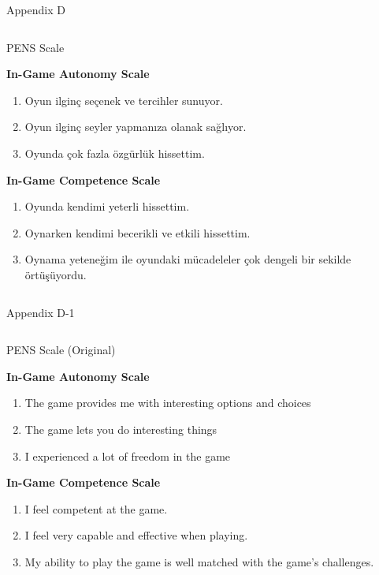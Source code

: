 \documentclass{beamer}
\begin{document}
\begin{frame}[label=appD, plain]{Appendix D}
  \begin{columns}[t]
    \begin{exampleblock}{PENS Scale}

\small \textbf{In-Game Autonomy Scale}
\begin{enumerate}
\item Oyun ilginç seçenek ve tercihler sunuyor.
\item Oyun ilginç seyler yapmanıza olanak sağlıyor.
\item Oyunda çok fazla özgürlük hissettim.
\end{enumerate}

\small \textbf{In-Game Competence Scale}
\begin{enumerate}
\item  Oyunda kendimi yeterli hissettim.
\item  Oynarken kendimi becerikli ve etkili hissettim.
\item  Oynama yeteneğim ile oyundaki mücadeleler çok dengeli bir sekilde örtüşüyordu.
\end{enumerate}

    \end{exampleblock}
  \end{columns}  
\end{frame}

\begin{frame}[label=appD1, plain]{Appendix D-1}
  \begin{columns}[t]
    \begin{exampleblock}{PENS Scale (Original) \cite{Dennie2012AutonomyMotivation, PrzybylskiRigbyRyan2006MotivationPullofGames, Peng2012NeedSupportiveFeatures}}

\small \textbf{In-Game Autonomy Scale}
\begin{enumerate}
\item The game provides me with interesting options and choices
\item The game lets you do interesting things
\item I experienced a lot of freedom in the game
\end{enumerate}

\small \textbf{In-Game Competence Scale}
\begin{enumerate}
\item  I feel competent at the game.
\item  I feel very capable and effective when playing.
\item  My ability to play the game is well matched with the game's challenges.
\end{enumerate}

    \end{exampleblock}
  \end{columns}  
\end{frame}
\end{document}
